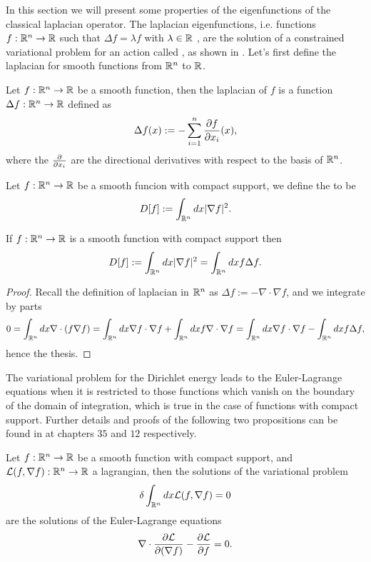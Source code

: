 \documentclass[../2.tex]{subfiles}
\begin{document}
In this section we will present some properties of the eigenfunctions of the classical laplacian operator.
The laplacian eigenfunctions, i.e. functions $f: \mathbb{R}^n \to \mathbb{R}$ such that $\Delta f = \lambda f$ with $\lambda \in \mathbb{R}$ , are the solution of a constrained variational problem for an action called , as shown in \cite{bronstein}.
Let's first define the laplacian for smooth functions from $\mathbb{R}^n$ to $\mathbb{R}$. 

\begin{defn}
    Let $f : \mathbb{R}^n \to \mathbb{R}$ be a smooth function, then the laplacian of $f$ is a function $\Delta f : \mathbb{R}^n \to \mathbb{R}$ defined as
    \[ \Delta f(x) := - \sum_{i=1}^n \frac{\partial f}{\partial x_i}(x), \]
    where the $\frac{\partial}{\partial x_i}$ are the directional derivatives with respect to the basis of $\mathbb{R}^n$.
\end{defn}

\begin{defn}
    Let $f:\mathbb{R}^n \to \mathbb{R}$ be a smooth funcion with compact support, we define the  to be
    \[ D[f] := \int_{\mathbb{R}^n} dx |\nabla f|^2 .\]
\end{defn}

\begin{prop}
    If $f:\mathbb{R}^n \to\mathbb{R}$ is a smooth function with compact support then 
    \[ D[f] := \int_{\mathbb{R}^n} dx |\nabla f|^2 = \int_{\mathbb{R}^n} dx f\Delta f .\]
\end{prop}
\begin{proof}
    Recall the definition of laplacian in $\mathbb{R}^n$ as $\Delta f := -\nabla \cdot \nabla f$, and we integrate by parts
    \[ 0 = \int_{\mathbb{R}^n} dx \nabla \cdot (f \nabla f) = \int_{\mathbb{R}^n} dx \nabla f \cdot \nabla f + \int_{\mathbb{R}^n} dx f \nabla \cdot \nabla f = \int_{\mathbb{R}^n} dx \nabla f \cdot \nabla f - \int_{\mathbb{R}^n} dx f \Delta f, \]
    hence the thesis. \qedhere
\end{proof}

The variational problem for the Dirichlet energy leads to the Euler-Lagrange equations when it is restricted to those functions which
vanish on the boundary of the domain of integration, which is true in the case of functions with compact support.
Further details and proofs of the following two propositions can be found in \cite{fomin} at chapters $35$ and $12$ respectively.

\begin{prop}
    Let $f:\mathbb{R}^n \to \mathbb{R}$ be a smooth function with compact support, and $\mathcal{L}(f,\nabla f) : \mathbb{R}^n \to \mathbb{R}$ a lagrangian,
    then the solutions of the variational problem 
    \[ \delta\int_{\mathbb{R}^n} dx \mathcal{L}(f,\nabla f) = 0 \]
    are the solutions of the Euler-Lagrange equations
    \[ \nabla \cdot \frac{\partial \mathcal{L}}{\partial(\nabla f)} - \frac{\partial\mathcal{L}}{\partial f} = 0. \]
\end{prop}
\end{document}
